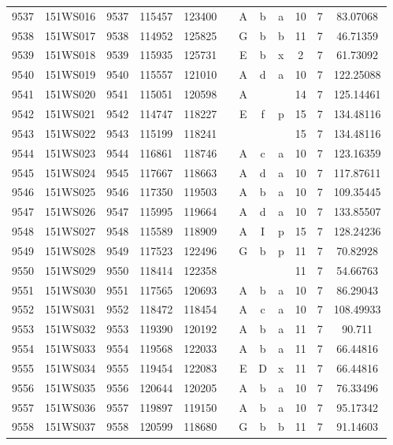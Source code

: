 \begin{tabular}{|*{12}{c|}}
9537 & 151WS016 & 9537 & 115457 & 123400 &  & A & b & a & 10 & 7 & 83.07068 \\ 
9538 & 151WS017 & 9538 & 114952 & 125825 &  & G & b & b & 11 & 7 & 46.71359 \\ 
9539 & 151WS018 & 9539 & 115935 & 125731 &  & E & b & x & 2 & 7 & 61.73092 \\ 
9540 & 151WS019 & 9540 & 115557 & 121010 &  & A & d & a & 10 & 7 & 122.25088 \\ 
9541 & 151WS020 & 9541 & 115051 & 120598 &  & A &  &  & 14 & 7 & 125.14461 \\ 
9542 & 151WS021 & 9542 & 114747 & 118227 &  & E & f & p & 15 & 7 & 134.48116 \\ 
9543 & 151WS022 & 9543 & 115199 & 118241 &  &  &  &  & 15 & 7 & 134.48116 \\ 
9544 & 151WS023 & 9544 & 116861 & 118746 &  & A & c & a & 10 & 7 & 123.16359 \\ 
9545 & 151WS024 & 9545 & 117667 & 118663 &  & A & d & a & 10 & 7 & 117.87611 \\ 
9546 & 151WS025 & 9546 & 117350 & 119503 &  & A & b & a & 10 & 7 & 109.35445 \\ 
9547 & 151WS026 & 9547 & 115995 & 119664 &  & A & d & a & 10 & 7 & 133.85507 \\ 
9548 & 151WS027 & 9548 & 115589 & 118909 &  & A & I & p & 15 & 7 & 128.24236 \\ 
9549 & 151WS028 & 9549 & 117523 & 122496 &  & G & b & p & 11 & 7 & 70.82928 \\ 
9550 & 151WS029 & 9550 & 118414 & 122358 &  &  &  &  & 11 & 7 & 54.66763 \\ 
9551 & 151WS030 & 9551 & 117565 & 120693 &  & A & b & a & 10 & 7 & 86.29043 \\ 
9552 & 151WS031 & 9552 & 118472 & 118454 &  & A & c & a & 10 & 7 & 108.49933 \\ 
9553 & 151WS032 & 9553 & 119390 & 120192 &  & A & b & a & 11 & 7 & 90.711 \\ 
9554 & 151WS033 & 9554 & 119568 & 122033 &  & A & b & a & 11 & 7 & 66.44816 \\ 
9555 & 151WS034 & 9555 & 119454 & 122083 &  & E & D & x & 11 & 7 & 66.44816 \\ 
9556 & 151WS035 & 9556 & 120644 & 120205 &  & A & b & a & 10 & 7 & 76.33496 \\ 
9557 & 151WS036 & 9557 & 119897 & 119150 &  & A & b & a & 10 & 7 & 95.17342 \\ 
9558 & 151WS037 & 9558 & 120599 & 118680 &  & G & b & b & 11 & 7 & 91.14603 \\ 

\end{tabular}
